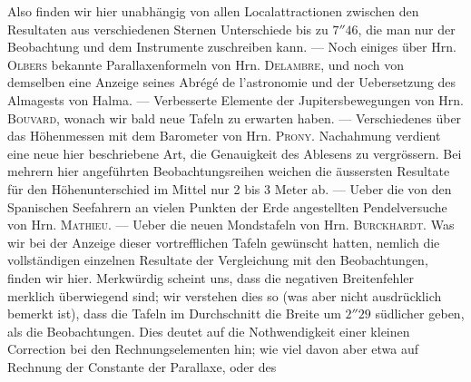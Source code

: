 Also finden wir hier unabhängig von allen Localattractionen zwischen den Resultaten aus verschiedenen Sternen Unterschiede bis zu $7''46$, die man nur der Beobachtung und dem Instrumente zuschreiben kann. --- Noch einiges über Hrn. \textsc{Olbers} bekannte Parallaxenformeln von Hrn. \textsc{Delambre}, und noch von demselben eine Anzeige seines Abrégé de l'astronomie und der Uebersetzung des Almagests von Halma. --- Verbesserte Elemente der Jupitersbewegungen von Hrn. \textsc{Bouvard}, wonach wir bald neue Tafeln zu erwarten haben. --- Verschiedenes über das Höhenmessen mit dem Barometer von Hrn. \textsc{Prony}. Nachahmung verdient eine neue hier beschriebene Art, die Genauigkeit des Ablesens zu vergrössern. Bei mehrern hier angeführten Beobachtungsreihen weichen die äussersten Resultate für den Höhenunterschied im Mittel nur 2 bis 3 Meter ab. --- Ueber die von den Spanischen Seefahrern an vielen Punkten der Erde angestellten Pendelversuche von Hrn. \textsc{Mathieu}. --- Ueber die neuen Mondstafeln von Hrn. \textsc{Burckhardt}. Was wir bei der Anzeige dieser vortrefflichen Tafeln gewünscht hatten, nemlich die vollständigen einzelnen Resultate der Vergleichung mit den Beobachtungen, finden wir hier. Merkwürdig scheint uns, dass die negativen Breitenfehler merklich überwiegend sind; wir verstehen dies so (was aber nicht ausdrücklich bemerkt ist), dass die Tafeln im Durchschnitt die Breite um $2''29$ südlicher geben, als die Beobachtungen. Dies deutet auf die Nothwendigkeit einer kleinen Correction bei den Rechnungselementen hin; wie viel davon aber etwa auf Rechnung der Constante der Parallaxe, oder des

